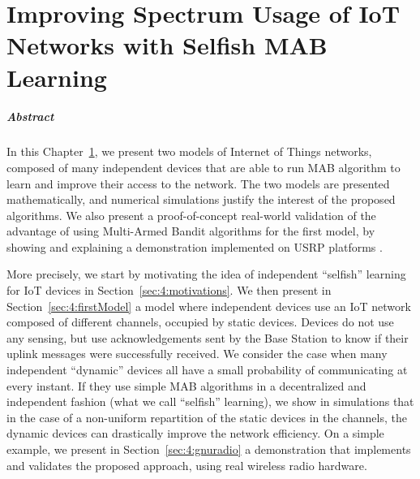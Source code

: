 
\chapter{Improving Spectrum Usage of IoT Networks with Selfish MAB Learning}
\label{chapter:4}
\minitoc
\graphicspath{{2-Chapters/4-Chapter/Images/}}


\newpage
\paragraph{Abstract}

In this Chapter~\ref{chapter:4}, we present two models of Internet of Things networks, composed of many independent devices that are able to run MAB algorithm to learn and improve their access to the network.
The two models are presented mathematically, and numerical simulations justify the interest of the proposed algorithms.
We also present a proof-of-concept real-world validation of the advantage of using Multi-Armed Bandit algorithms for the first model, by showing and explaining a demonstration implemented on USRP platforms \cite{USRPDocumentation}.

More precisely, we start by motivating the idea of independent ``selfish'' learning for IoT devices in Section~\ref{sec:4:motivations}.
We then present in Section~\ref{sec:4:firstModel} a model where independent devices use an IoT network composed of different channels, occupied by static devices.
Devices do not use any sensing, but use acknowledgements sent by the Base Station to know if their uplink messages were successfully received.
We consider the case when many independent ``dynamic'' devices all have a small probability of communicating at every instant. If they use simple MAB algorithms in a decentralized and independent fashion (what we call ``selfish'' learning),
we show in simulations that in the case of a non-uniform repartition of the static devices in the channels, the dynamic devices can drastically improve the network efficiency.
%
On a simple example, we present in Section~\ref{sec:4:gnuradio} a demonstration that implements and validates the proposed approach, using real wireless radio hardware.

